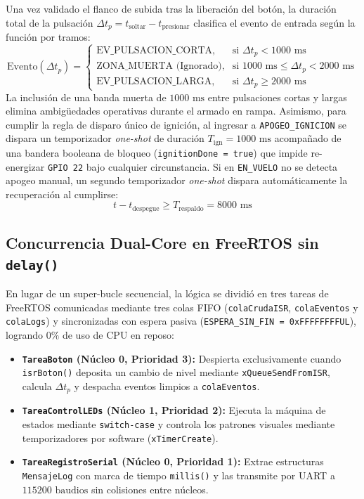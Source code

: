 \documentclass[10pt, letterpaper]{article}
\begin{document}
Una vez validado el flanco de subida tras la liberación del botón, la duración total de la pulsación $\Delta t_p = t_{\text{soltar}} - t_{\text{presionar}}$ clasifica el evento de entrada según la función por tramos:
\begin{equation}
    \text{Evento}(\Delta t_p) = 
    \begin{cases} 
        \text{EV\_PULSACION\_CORTA}, & \text{si } \Delta t_p < 1000\text{ ms} \\
        \text{ZONA\_MUERTA (Ignorado)}, & \text{si } 1000\text{ ms} \le \Delta t_p < 2000\text{ ms} \\
        \text{EV\_PULSACION\_LARGA}, & \text{si } \Delta t_p \ge 2000\text{ ms}
    \end{cases}
    \label{eq:pulsacion}
\end{equation}
La inclusión de una banda muerta de $1000\text{ ms}$ entre pulsaciones cortas y largas elimina ambigüedades operativas durante el armado en rampa. Asimismo, para cumplir la regla de disparo único de ignición, al ingresar a \texttt{APOGEO\_IGNICION} se dispara un temporizador \textit{one-shot} de duración $T_{\text{ign}} = 1000\text{ ms}$ acompañado de una bandera booleana de bloqueo (\texttt{ignitionDone = true}) que impide re-energizar \texttt{GPIO 22} bajo cualquier circunstancia. Si en \texttt{EN\_VUELO} no se detecta apogeo manual, un segundo temporizador \textit{one-shot} dispara automáticamente la recuperación al cumplirse:
\begin{equation}
    t - t_{\text{despegue}} \ge T_{\text{respaldo}} = 8000\text{ ms}
    \label{eq:respaldo}
\end{equation}

\subsection{Concurrencia Dual-Core en FreeRTOS sin \texttt{delay()}}
En lugar de un super-bucle secuencial, la lógica se dividió en tres tareas de FreeRTOS comunicadas mediante tres colas FIFO (\texttt{colaCrudaISR}, \texttt{colaEventos} y \texttt{colaLogs}) y sincronizadas con espera pasiva (\texttt{ESPERA\_SIN\_FIN = 0xFFFFFFFFUL}), logrando $0\%$ de uso de CPU en reposo:
\begin{itemize}\setlength{\itemsep}{1pt}\setlength{\parskip}{0pt}
    \item \textbf{\texttt{TareaBoton} (Núcleo 0, Prioridad 3):} Despierta exclusivamente cuando \texttt{isrBoton()} deposita un cambio de nivel mediante \texttt{xQueueSendFromISR}, calcula $\Delta t_p$ y despacha eventos limpios a \texttt{colaEventos}.
    \item \textbf{\texttt{TareaControlLEDs} (Núcleo 1, Prioridad 2):} Ejecuta la máquina de estados mediante \texttt{switch-case} y controla los patrones visuales mediante temporizadores por software (\texttt{xTimerCreate}).
    \item \textbf{\texttt{TareaRegistroSerial} (Núcleo 0, Prioridad 1):} Extrae estructuras \texttt{MensajeLog} con marca de tiempo \texttt{millis()} y las transmite por UART a $115200\text{ baudios}$ sin colisiones entre núcleos.
\end{itemize}
\end{document}
